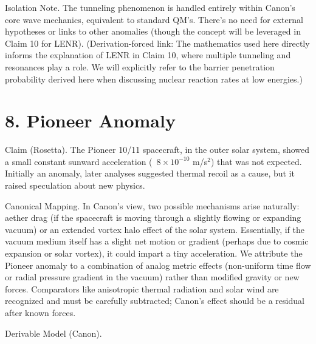 \documentclass[11pt]{article}
\begin{document}
Isolation Note. The tunneling phenomenon is handled entirely within Canon’s core wave mechanics, equivalent to standard QM’s. There’s no need for external hypotheses or links to other anomalies (though the concept will be leveraged in Claim 10 for LENR). (Derivation-forced link: The mathematics used here directly informs the explanation of LENR in Claim 10, where multiple tunneling and resonances play a role. We will explicitly refer to the barrier penetration probability derived here when discussing nuclear reaction rates at low energies.)


\section*{8. Pioneer Anomaly}

Claim (Rosetta). The Pioneer 10/11 spacecraft, in the outer solar system, showed a small constant sunward acceleration (~$8\times10^{-10}$ m/s$^2$) that was not expected. Initially an anomaly, later analyses suggested thermal recoil as a cause, but it raised speculation about new physics.


Canonical Mapping. In Canon’s view, two possible mechanisms arise naturally: aether drag (if the spacecraft is moving through a slightly flowing or expanding vacuum) or an extended vortex halo effect of the solar system. Essentially, if the vacuum medium itself has a slight net motion or gradient (perhaps due to cosmic expansion or solar vortex), it could impart a tiny acceleration. We attribute the Pioneer anomaly to a combination of analog metric effects (non-uniform time flow or radial pressure gradient in the vacuum) rather than modified gravity or new forces. Comparators like anisotropic thermal radiation and solar wind are recognized and must be carefully subtracted; Canon’s effect should be a residual after known forces.


Derivable Model (Canon).
\end{document}
